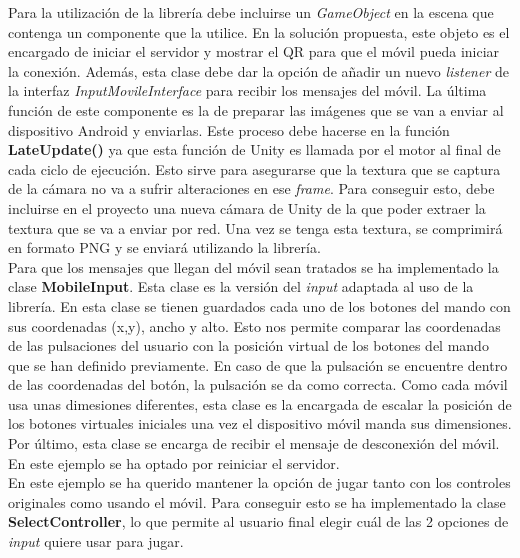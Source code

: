 Para la utilizaci\'on de la librer\'ia debe incluirse un \textit{GameObject} en la escena que contenga un componente que la utilice. En la soluci\'on propuesta, este objeto es el encargado de iniciar el servidor y mostrar el QR para que el m\'ovil pueda iniciar la conexi\'on. Adem\'as, esta clase debe dar la opci\'on de a\~nadir un nuevo \textit{listener} de la interfaz \textit{InputMovileInterface} para recibir los mensajes del m\'ovil. La \'ultima funci\'on de este componente es la de preparar las im\'agenes que se van a enviar al dispositivo Android y enviarlas. Este proceso debe hacerse en la funci\'on \textbf{LateUpdate()} ya que esta funci\'on de Unity es llamada por el motor al final de cada ciclo de ejecuci\'on. Esto sirve para asegurarse que la textura que se captura de la c\'amara no va a sufrir alteraciones en ese \textit{frame}. Para conseguir esto, debe incluirse en el proyecto una nueva c\'amara de Unity de la que poder extraer la textura que se va a enviar por red. Una vez se tenga esta textura, se comprimir\'a en formato PNG y se enviar\'a utilizando la librer\'ia.\\

Para que los mensajes que llegan del m\'ovil sean tratados se ha implementado la clase \textbf{MobileInput}. Esta clase es la versi\'on del \textit{input} adaptada al uso de la librer\'ia. En esta clase se tienen guardados cada uno de los botones del mando con sus coordenadas (x,y), ancho y alto. Esto nos permite comparar las coordenadas de las pulsaciones del usuario con la posici\'on virtual de los botones del mando que se han definido previamente. En caso de que la pulsaci\'on se encuentre dentro de las coordenadas del bot\'on, la pulsaci\'on se da como correcta. Como cada m\'ovil usa unas dimesiones diferentes, esta clase es la encargada de escalar la posici\'on de los botones virtuales iniciales una vez el dispositivo m\'ovil manda sus dimensiones. Por \'ultimo, esta clase se encarga de recibir el mensaje de desconexi\'on del m\'ovil. En este ejemplo se ha optado por reiniciar el servidor. \\

En este ejemplo se ha querido mantener la opci\'on de jugar tanto con los controles originales como usando el m\'ovil. Para conseguir esto se ha implementado la clase \textbf{SelectController}, lo que permite al usuario final elegir cu\'al de las 2 opciones de \textit{input} quiere usar para jugar. 

